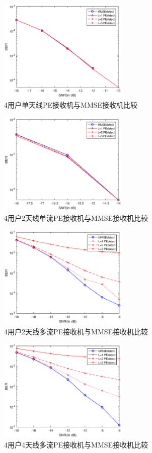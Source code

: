 \documentclass[bachelor,nocolorlinks, printoneside]{seuthesis} %
\begin{document}
\begin{Main}
\begin{figure}[htbp!]
	\centering \includegraphics[width=0.55\textwidth]{img/4_1.eps} \caption{4用户单天线PE接收机与MMSE接收机比较}
\end{figure}
\begin{figure}[htbp!]
	\centering \includegraphics[width=0.55\textwidth]{img/4_2.eps} \caption{4用户2天线单流PE接收机与MMSE接收机比较}
\end{figure}
\begin{figure}[htbp!]
	\centering \includegraphics[width=0.55\textwidth]{img/4_3.eps} \caption{4用户2天线多流PE接收机与MMSE接收机比较}
\end{figure}
\begin{figure}[htbp!]
	\centering \includegraphics[width=0.55\textwidth]{img/4_4.eps} \caption{4用户4天线多流PE接收机与MMSE接收机比较}
\end{figure}

\end{Main}
\end{document}
